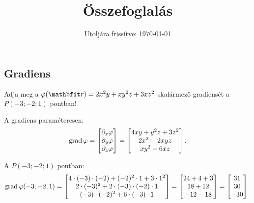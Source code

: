 \documentclass[fleqn]{szb-practice}
\title{Összefoglalás}
\date{Utoljára frissítve: \today}
\begin{document}
\maketitle

\subsection{Gradiens}

Adja meg a $\varphi(\coordvec) = {2 x^2 y} + {x y^2 z} + {3 x z^2}$ skalármező
gradiensét a $P(-3; -2; 1)$ pontban!

A gradiens paraméteresen:
\begin{equation*}
  \operatorname{grad} \varphi = \begin{bmatrix}
    \partial_x \varphi \\
    \partial_y \varphi \\
    \partial_z \varphi
  \end{bmatrix} = \begin{bmatrix}
    4 x y + y^2 z + 3z^2 \\
    2 x^2 + 2 x y z      \\
    x y^2 + 6 x z
  \end{bmatrix}
  \text.
\end{equation*}

A $P(-3; -2; 1)$ pontban:
\begin{equation*}
  \operatorname{grad} \varphi(-3; -2; 1)
  = \begin{bmatrix}
    4 \cdot (-3) \cdot (-2) + (-2)^2 \cdot 1 + 3 \cdot 1^2 \\
    2 \cdot (-3)^2 + 2 \cdot (-3) \cdot (-2) \cdot 1       \\
    (-3) \cdot (-2)^2 + 6 \cdot (-3) \cdot 1
  \end{bmatrix} = \begin{bmatrix}
    24 + 4 + 3 \\
    18 + 12    \\
    -12 - 18
  \end{bmatrix} = \begin{bmatrix}
    31 \\
    30 \\
    -30
  \end{bmatrix}
  \text.
\end{equation*}
\end{document}
